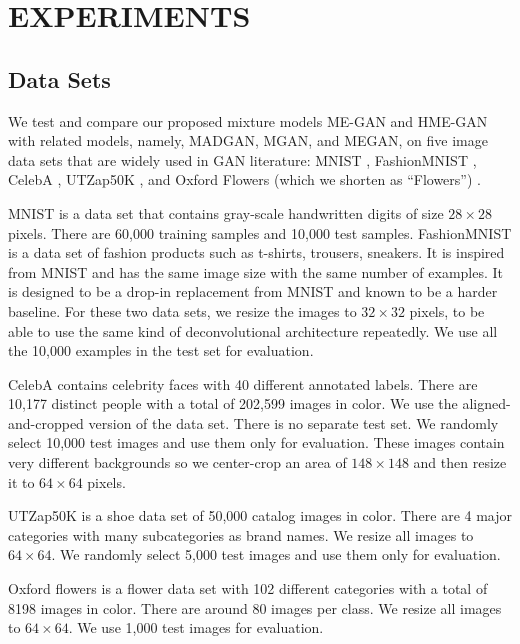 \documentclass[a4paper,onesided,12pt]{report}
\begin{document}
\chapter{EXPERIMENTS}
\label{chapter:exps}

\section{Data Sets}
\label{sec:datasets}
We test and compare our proposed mixture models ME-GAN and HME-GAN with related models, namely, MADGAN, MGAN, and MEGAN, on five image data sets that are widely used in GAN literature: MNIST \cite{lecun1998mnist}, FashionMNIST \cite{xiao2017fashion}, CelebA \cite{liu2015deep},  UTZap50K \cite{yu2014fine}, and Oxford Flowers (which we shorten as ``Flowers'') \cite{nilsback2008automated}.

MNIST is a data set that contains gray-scale handwritten digits of size $28 \times 28$ pixels. There are 60,000 training samples and 10,000 test samples. FashionMNIST is a data set of fashion products such as t-shirts, trousers, sneakers. It is inspired from MNIST and has the same image size with the same number of examples. It is designed to be a drop-in replacement from MNIST and known to be a harder baseline. For these two data sets, we resize the images to $32 \times 32$ pixels, to be able to use the same kind of deconvolutional architecture repeatedly. We use all the 10,000 examples in the test set for evaluation.

CelebA contains celebrity faces with 40 different annotated labels. There are 10,177 distinct people with a total of 202,599 images in color. We use the aligned-and-cropped version of the data set. There is no separate test set. We randomly select 10,000 test images and use them only for evaluation. These images contain very different backgrounds so we center-crop an area of $148 \times 148$ and then resize it to $64 \times 64$ pixels.

UTZap50K is a shoe data set of 50,000 catalog images in color. There are 4 major categories with many subcategories as brand names. We resize all images to $64 \times 64$. We randomly select 5,000 test images and use them only for evaluation.

Oxford flowers is a flower data set with 102 different categories with a total of 8198 images in color. There are around 80 images per class. We resize all images to $64 \times 64$. We use 1,000 test images for evaluation.
\end{document}

